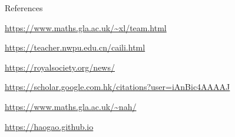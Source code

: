 
\begin{rubric}{References}

\entry*[Supervisors] 
\url{https://www.maths.gla.ac.uk/~xl/team.html}\par
\url{https://teacher.nwpu.edu.cn/caili.html}\par


\entry*[Fellowship]%
\url{https://royalsociety.org/news/}\par

\entry*[Publication]%
\url{https://scholar.google.com.hk/citations?user=iAnBic4AAAAJ}



\entry*[Collaborators]%
\url{https://www.maths.gla.ac.uk/~nah/}\par
\url{https://haogao.github.io}\par




\end{rubric}